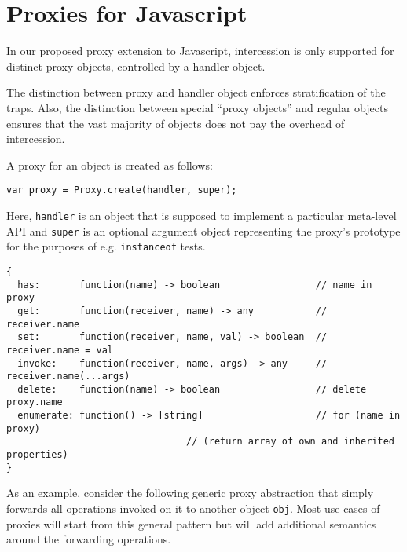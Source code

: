 \documentclass{acm_proc_article-sp}
\begin{document}
\section{Proxies for Javascript}
\label{sec:proxies_for_javascript}

In our proposed proxy extension to Javascript, intercession is only supported for distinct proxy objects, controlled by a handler object.

The distinction between proxy and handler object enforces stratification of the traps. Also, the distinction between special ``proxy objects'' and regular objects ensures that the vast majority of objects does not pay the overhead of intercession.


A proxy for an object is created as follows:

\begin{lstlisting}
var proxy = Proxy.create(handler, super);
\end{lstlisting}

Here, \texttt{handler} is an object that is supposed to implement a particular meta-level API and \texttt{super} is an optional argument object representing the proxy's prototype for the purposes of e.g. \texttt{instanceof} tests.

\begin{lstlisting}
{
  has:       function(name) -> boolean                 // name in proxy
  get:       function(receiver, name) -> any           // receiver.name
  set:       function(receiver, name, val) -> boolean  // receiver.name = val
  invoke:    function(receiver, name, args) -> any     // receiver.name(...args)
  delete:    function(name) -> boolean                 // delete proxy.name
  enumerate: function() -> [string]                    // for (name in proxy)
                                // (return array of own and inherited properties)
}
\end{lstlisting}

As an example, consider the following generic proxy abstraction that simply forwards all operations invoked on it to another object \texttt{obj}. Most use cases of proxies will start from this general pattern but will add additional semantics around the forwarding operations.
\end{document}
